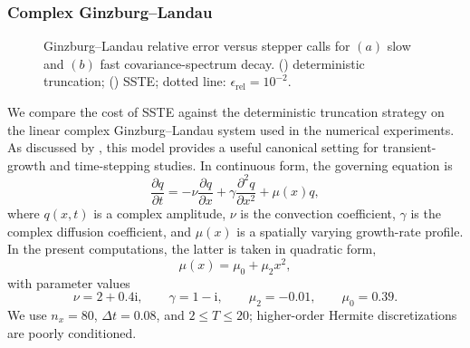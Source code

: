 \subsubsection{Complex Ginzburg--Landau}
\label{sec:appendix_verification_gl}
\begin{figure}
    \centering
    \begin{minipage}[t]{0.48\textwidth}
        \centering
        \vspace{0pt}
        
    \end{minipage}
    \hfill
    \begin{minipage}[t]{0.48\textwidth}
        \centering
        \vspace{0pt}
        
    \end{minipage}
    \caption{Ginzburg--Landau relative error versus stepper calls for \((a)\) slow and \((b)\) fast covariance-spectrum decay. (\solidlegend) deterministic truncation; (\dashlegend\circlegend) SSTE; dotted line: \(\epsilon_{\mathrm{rel}}=10^{-2}\).}
    \label{fig:GL_eig_vs_sste}
\end{figure}
We compare the cost of SSTE against the deterministic truncation strategy on the linear complex Ginzburg--Landau system used in the numerical experiments. As discussed by \citet{frame-towne-2024}, this model provides a useful canonical setting for transient-growth and time-stepping studies. In continuous form, the governing equation is
\begin{equation}
  \frac{\partial q}{\partial t}
  =
  -\nu\frac{\partial q}{\partial x}
  +
  \gamma\frac{\partial^2 q}{\partial x^2}
  +
  \mu(x)q,
  \label{eq:GL_continuous_equation_sste_necessity}
\end{equation}
where \(q(x,t)\) is a complex amplitude, \(\nu\) is the convection coefficient, \(\gamma\) is the complex diffusion coefficient, and \(\mu(x)\) is a spatially varying growth-rate profile. In the present computations, the latter is taken in quadratic form,
\begin{equation}
  \mu(x)
  =
  \mu_0+\mu_2x^2,
  \label{eq:GL_mu_profile_sste_necessity}
\end{equation}
with parameter values
\begin{equation}
  \nu = 2+0.4\mathrm{i},
  \qquad
  \gamma = 1-\mathrm{i},
  \qquad
  \mu_2 = -0.01,
  \qquad
  \mu_0 = 0.39.
  \label{eq:GL_parameters_sste_necessity}
\end{equation}
We use \(n_x=80\), \(\Delta t=0.08\), and \(2\leq T\leq20\); higher-order Hermite discretizations are poorly conditioned.
